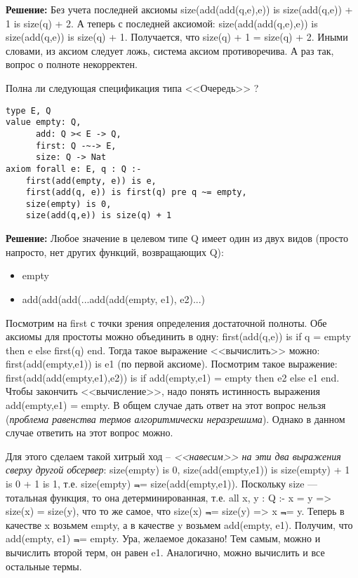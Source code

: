 \textbf{Решение:}
Без учета последней аксиомы size(add(add(q,e),e)) is size(add(q,e)) + 1 is size(q) + 2. А теперь с последней аксиомой: size(add(add(q,e),e)) is size(add(q,e)) is size(q) + 1. Получается, что size(q) + 1 = size(q) + 2. Иными словами, из аксиом следует ложь, система аксиом противоречива. А раз так, вопрос о полноте некорректен.


\z Полна ли следующая спецификация типа <<Очередь>> ?
\begin{lstlisting}
type E, Q
value empty: Q,
      add: Q >< E -> Q,
      first: Q -~-> E,
      size: Q -> Nat
axiom forall e: E, q : Q :-
    first(add(empty, e)) is e,
    first(add(q, e)) is first(q) pre q ~= empty,
    size(empty) is 0,
    size(add(q,e)) is size(q) + 1
\end{lstlisting}

\textbf{Решение:}
Любое значение в целевом типе Q имеет один из двух видов (просто напросто, нет других функций, возвращающих Q):
\begin{itemize}
  \item empty
  \item add(add(add(...add(add(empty, e1), e2)...)
\end{itemize}

Посмотрим на first с точки зрения определения достаточной полноты. Обе аксиомы для простоты можно объединить в одну: first(add(q,e)) is if q = empty then e else first(q) end. Тогда такое выражение <<вычислить>> можно: first(add(empty,e1)) is e1 (по первой аксиоме). Посмотрим такое выражение: first(add(add(empty,e1),e2)) is if add(empty,e1) = empty then e2 else e1 end. Чтобы закончить <<вычисление>>, надо понять истинность выражения add(empty,e1) = empty. В общем случае дать ответ на этот вопрос нельзя (\emph{проблема равенства термов алгоритмически неразрешима}). Однако в данном случае ответить на этот вопрос можно.

Для этого сделаем такой хитрый ход -- \emph{<<навесим>> на эти два выражения сверху другой обсервер}: size(empty) is 0, size(add(empty,e1)) is size(empty) + 1 is 0 + 1 is 1, т.е. size(empty) $\Not$= size(add(empty,e1)). Поскольку size --- тотальная функция, то она детерминированная, т.е. all x, y : Q :- x = y => size(x) = size(y), что то же самое, что size(x) $\Not$= size(y) => x $\Not$= y. Теперь в качестве x возьмем empty, а в качестве y возьмем add(empty, e1). Получим, что add(empty, e1) $\Not$= empty. Ура, желаемое доказано! Тем самым, можно и вычислить второй терм, он равен e1. Аналогично, можно вычислить и все остальные термы.

